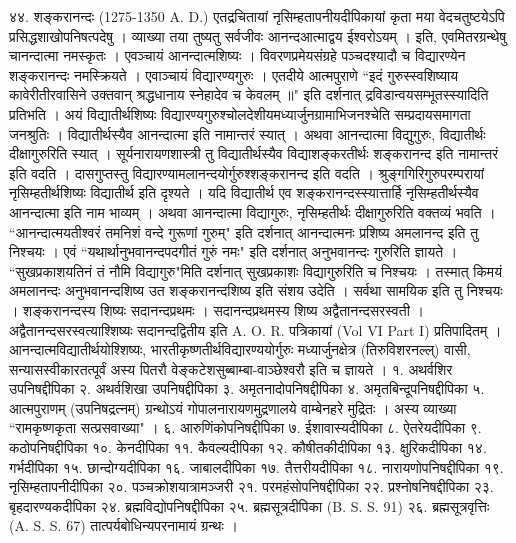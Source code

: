 ४४. शङ्करानन्दः (1275-1350 A. D.)
एतद्रचितायां नृसिम्हतापनीयदीपिकायां कृता मया वेदचतुष्टयेऽपि प्रसिद्धशाखोपनिषत्पदेषु । व्याख्या तया तुष्यतु सर्वजीवः आनन्दआत्माद्वय ईश्वरोऽयम् । इति, एवमितरग्रन्थेषु चानन्दात्मा नमस्कृतः । एवञ्चायं आनन्दात्मशिष्यः । विवरणप्रमेयसंग्रहे पञ्चदश्यादौ च विद्यारण्येन शङ्करानन्दः नमस्क्रियते । एवाञ्चायं विद्यारण्यगुरुः । एतदीये आत्मपुराणे ``इदं गुरुस्स्वशिष्याय कावेरीतीरवासिने उक्तवान् श्रद्धधानाय स्नेहादेव च केवलम् ॥" इति दर्शनात् द्रविडान्वयसम्भूतस्स्यादिति प्रतिभति ।
अयं विद्यातीर्थशिष्यः विद्यारण्यगुरुश्चोलदेशीयमध्यार्जुनग्रामाभिजनश्चेति सम्प्रदायसमागता जनश्रुतिः । विद्यातीर्थस्यैव आनन्दात्मा इति नामान्तरं स्यात् । अथवा आनन्दात्मा विद्युगुरुः, विद्यातीर्थः दीक्षागुरुरिति स्यात् । सूर्यनारायणशास्त्री तु विद्यातीर्थस्यैव विद्याशङ्करतीर्थः शङ्करानन्द इति नामान्तरं इति वदति । दासगुप्तस्तु विद्यारण्यामलानन्दयोर्गुरुश्शङ्करानन्द इति वदति । श्रुङ्गगिरिगुरुपरम्परायां नृसिम्हतीर्थशिष्यः विद्यातीर्थ इति दृश्यते । यदि विद्यातीर्थ एव शङ्करानन्दस्स्यात्तार्हि नृसिम्हतीर्थस्यैव आनन्दात्मा इति नाम भाव्यम् । अथवा आनन्दात्मा विद्यागुरुः, नृसिम्हतीर्थः दीक्षागुरुरिति वक्तव्यं भवति । ``आनन्दात्मयतीश्वरं तमनिशं वन्दे गुरूणां गुरुम्" इति दर्शनात् आनन्दात्मनः प्रशिष्य अमलानन्द इति तु निश्चयः । एवं ``यथार्थानुभवानन्दपदगीतं गुरुं नमः" इति दर्शनात् अनुभवानन्दः गुरुरिति ज्ञायते । ``सुखप्रकाशयतिनं तं नौमि विद्यागुरु"मिति दर्शनात् सुखप्रकाशः विद्यागुरुरिति च निश्चयः । तस्मात् किमयं अमलानन्दः अनुभवानन्दशिष्य उत शङ्करानन्दशिष्य इति संशय उदेति । सर्वथा सामयिक इति तु निश्चयः ।
शङ्करानन्दस्य शिष्यः सदानन्दप्रथमः । सदानन्दप्रथमस्य शिष्य अद्वैतानन्दसरस्वती । अद्वैतानन्दसरस्वत्याश्शिष्यः सदानन्दद्वितीय इति A. O. R. पत्रिकायां (Vol VI Part I) प्रतिपादितम् ।
आनन्दात्मविद्यातीर्थयोश्शिष्यः, भारतीकृष्णतीर्थविद्यारण्ययोर्गुरुः मध्यार्जुनक्षेत्र (तिरुविशरनल्ल्) वासी, सन्यासस्वीकारतत्पूर्वं अस्य पितरौ वेङ्कटेशसुब्बाम्बा-वाञ्छेश्वरौ इति च ज्ञायते ।
१. अथर्वशिर उपनिषद्दीपिका
२. अथर्वशिखा उपनिषद्दीपिका
३. अमृतनादोपनिषद्दीपिका
४. अमृतबिन्दूपनिषद्दीपिका
५. आत्मपुराणम् (उपनिषद्रत्नम्) ग्रन्थोऽयं गोपालनारायणमुद्रणालये वाम्बेनहरे मुद्रितः । अस्य व्याख्या ``रामकृष्णकृता सत्प्रसवाख्या" ।
६. आरुणिंकोपनिषद्दीपिका
७. ईशावास्यदीपिका
८. ऐतरेयदीपिका 
९. कठोपनिषद्दीपिका
१०. केनदीपिका
११. कैवल्यदीपिका
१२. कौषीतकीदीपिका
१३. क्षुरिकदीपिका
१४. गर्भदीपिका
१५. छान्दोग्यदीपिका
१६. जाबालदीपिका
१७. तैत्तरीयदीपिका
१८. नारायणोपनिषद्दीपिका
१९. नृसिम्हतापनीदीपिका
२०. पञ्चक्रोशयात्रामञ्जरी
२१. परमहंसोपनिषद्दीपिका
२२. प्रश्नोषनिषद्दीपिका
२३. बृहदारण्यकदीपिका
२४. ब्रह्मविद्योपनिषद्दीपिका
२५. ब्रह्मसूत्रदीपिका (B. S. S. 91)
२६. ब्रह्मसूत्रवृत्तिः (A. S. S. 67) तात्पर्यबोधिन्यपरनामायं ग्रन्थः ।
